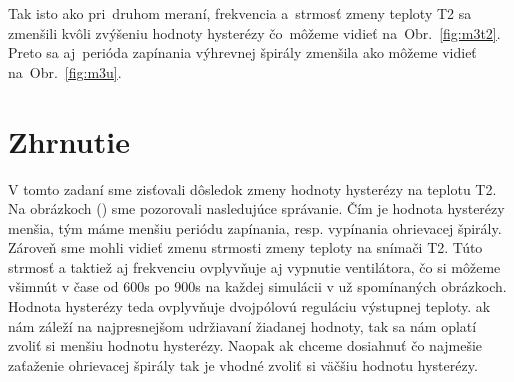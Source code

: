 \documentclass{article}
\begin{document}
Tak isto ako pri~druhom meraní, frekvencia a~strmosť zmeny teploty T2 sa zmenšili kvôli zvýšeniu hodnoty hysterézy
čo~môžeme vidieť na~Obr.~\ref{fig:m3t2}. Preto sa aj~perióda zapínania výhrevnej špirály zmenšila ako môžeme vidieť
na~Obr.~\ref{fig:m3u}.

\section{Zhrnutie}
\label{sec:zhrnutie}

V tomto zadaní sme zisťovali dôsledok zmeny hodnoty hysterézy na teplotu T2. Na obrázkoch () sme pozorovali nasledujúce správanie. Čím je hodnota hysterézy menšia, tým máme menšiu periódu zapínania, resp. vypínania ohrievacej špirály. Zároveň sme mohli vidieť zmenu strmosti zmeny teploty na snímači T2. Túto strmosť a taktiež aj frekvenciu ovplyvňuje aj vypnutie ventilátora, čo si môžeme všimnút v čase od 600s po 900s na každej simulácii v už spomínaných obrázkoch. Hodnota hysterézy teda ovplyvňuje dvojpólovú reguláciu výstupnej teploty. ak nám záleží na najpresnejšom udržiavaní žiadanej hodnoty, tak sa nám oplatí zvoliť si menšiu hodnotu hysterézy. Naopak ak chceme dosiahnuť čo najmešie zaťaženie ohrievacej špirály tak je vhodné zvoliť si väčšiu hodnotu hysterézy.
\end{document}
